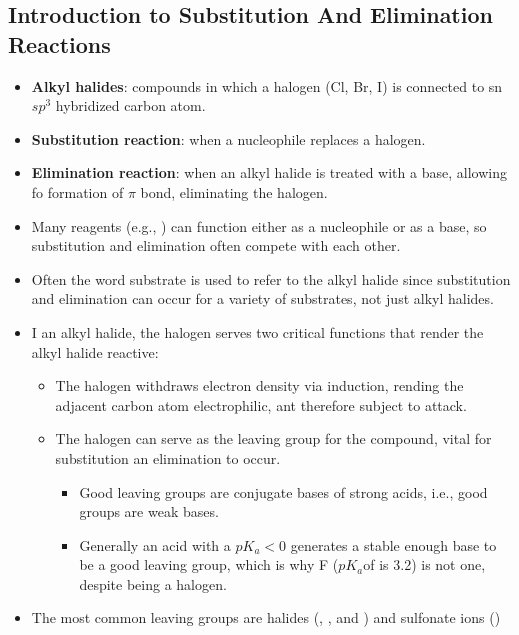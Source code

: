 \documentclass[12pt,a4paper]{article}
\begin{document}
\subsection{Introduction to Substitution And Elimination Reactions}
\begin{itemize}
    \item \textbf{Alkyl halides}: compounds in which a halogen (Cl, Br, I) is connected to sn \(sp^3\) hybridized carbon atom.
    \item \textbf{Substitution reaction}: when a {\color{neg}nucleophile} replaces a halogen.
    \item \textbf{Elimination reaction}: when an alkyl halide is treated with a {\color{neg}base}, allowing fo formation of $\pi$ bond, eliminating the halogen.
    \item Many reagents (e.g., {\color{neg}}) can function either as a nucleophile or as a base, so substitution and elimination often compete with each other.
    \item Often the word {\color{o-Sun}substrate} is used to refer to the alkyl halide since substitution and elimination can occur for a variety of substrates, not just alkyl halides.
    \item I an alkyl halide, the halogen serves two critical functions that render the alkyl halide reactive:
        \begin{itemize}
            \item The halogen withdraws electron density via {\color{o-Sun}induction}, rending the adjacent carbon atom electrophilic, ant therefore subject to attack.
            \item The halogen can serve as the {\color{o-Sun}leaving group} for the compound, vital for substitution an elimination to occur.
                \begin{itemize}
                    \item Good leaving groups are conjugate bases of strong acids, i.e., good groups are weak bases.
                    \item Generally an acid with a \(pK_a < 0\) generates a stable enough base to be a good leaving group, which is why F (\(pK_a\)of  is 3.2) is not one, despite being a halogen.
                \end{itemize}
        \end{itemize}
    \item The most common leaving groups are halides ({\color{neg}}, {\color{neg}}, and {\color{neg}}) and sulfonate ions ({\color{neg}})

\end{itemize}
\end{document}
